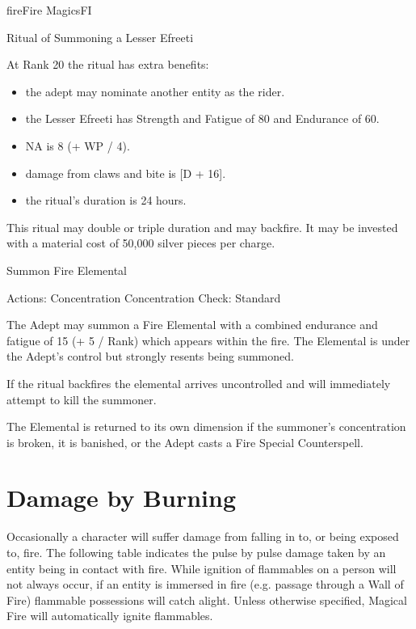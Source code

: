 \begin{College}[2.0]{fire}{Fire Magics}{FI}
\begin{ritual}[R-3]{Ritual of Summoning a Lesser Efreeti}
\begin{effects}
At Rank 20 the ritual has extra benefits:  

\begin{itemize}
\item the adept may nominate another entity as the rider.

\item the Lesser Efreeti has Strength and Fatigue of 80 and Endurance
  of 60.

\item NA is 8 (+ WP / 4).

\item damage from claws and bite is [D + 16].  

\item the ritual’s duration is 24 hours. 
\end{itemize}

This ritual may double or triple duration and may backfire. It may be
invested with a material cost of 50,000 silver pieces per charge.
\end{effects}
\end{ritual}

\begin{ritual}[R-4]{Summon Fire Elemental}

Actions: Concentration 
Concentration Check: Standard 
\begin{effects}
The Adept may summon a Fire Elemental with a combined endurance and
fatigue of 15 (+ 5 / Rank) which appears within the fire.  The
Elemental is under the Adept’s control but strongly resents being
summoned.

If the ritual backfires the elemental arrives uncontrolled and will
immediately attempt to kill the summoner.

The Elemental is returned to its own dimension if the summoner’s
concentration is broken, it is banished, or the Adept casts a Fire
Special Counterspell.
\end{effects}
\end{ritual}

\section{Damage by Burning}

Occasionally a character will suffer damage from falling in to, or
being exposed to, fire. The following table indicates the pulse by
pulse damage taken by an entity being in contact with fire. While
ignition of flammables on a person will not always occur, if an entity
is immersed in fire (e.g. passage through a Wall of Fire) flammable
possessions will catch alight.  Unless otherwise specified, Magical
Fire will automatically ignite flammables.


\end{College}
